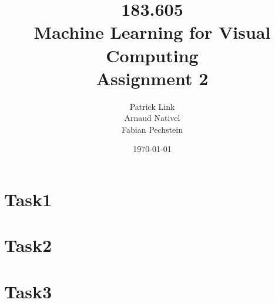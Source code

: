 \documentclass[a4]{article}
\title{\bf 183.605 \\ Machine Learning for Visual Computing \\ Assignment 2}
\author{Patrick Link \\ Arnaud Nativel \\ Fabian Pechstein}
\date{\today}
\begin{document}
\maketitle
\noindent

\section{Task1}


\section{Task2}



\section{Task3}

\end{document}
